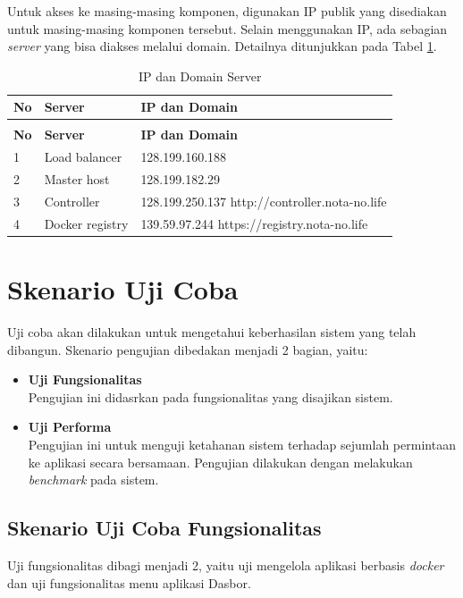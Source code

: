     \indent Untuk akses ke masing-masing komponen, digunakan IP publik yang disediakan untuk masing-masing komponen tersebut. Selain menggunakan IP, ada sebagian \textit{server} yang bisa diakses melalui domain. Detailnya ditunjukkan pada Tabel \ref{ipdomainserver}.
    			\begin{longtable}{|p{}|p{}|p{}|}					\caption{IP dan Domain Server} \label{ipdomainserver} \\
					\hline
					\textbf{No} & \textbf{Server} & \textbf{IP dan Domain} \\ \hline
					\endfirsthead
					\caption[]{IP dan Domain Server} \\
					\hline
					\textbf{No} & \textbf{Server} & \textbf{IP dan Domain} \\ \hline
					\endhead
					\endfoot
					\endlastfoot
					
                    1 & Load balancer & 128.199.160.188 \\ \hline
                    2 & Master host & 128.199.182.29 \\ \hline
                    3 & Controller & 128.199.250.137 http://controller.nota-no.life \\ \hline
                    4 & Docker registry & 139.59.97.244 https://registry.nota-no.life \\ \hline
				\end{longtable}
    
\section{Skenario Uji Coba} \label{skenarioujicoba}
	Uji coba akan dilakukan untuk mengetahui keberhasilan sistem yang telah dibangun. Skenario pengujian dibedakan menjadi 2 bagian, yaitu:
    \begin{itemize}
    \item \textbf{Uji Fungsionalitas} \\
    	Pengujian ini didasrkan pada fungsionalitas yang disajikan sistem.
    \item \textbf{Uji Performa} \\
    	Pengujian ini untuk menguji ketahanan sistem terhadap sejumlah permintaan ke aplikasi secara bersamaan. Pengujian dilakukan dengan melakukan \textit{benchmark} pada sistem.
    \end{itemize}
    
    \subsection{Skenario Uji Coba Fungsionalitas}
    	Uji fungsionalitas dibagi menjadi 2, yaitu uji mengelola aplikasi berbasis \textit{docker} dan uji fungsionalitas menu aplikasi Dasbor.
        
